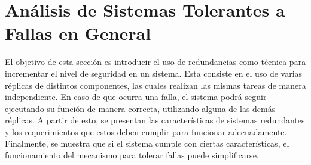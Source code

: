 \section{Análisis de Sistemas Tolerantes a Fallas en General}\label{sec:requerimentos_sistema_tolerancia_fallas}





El objetivo de esta sección es introducir el uso de redundancias como técnica para incrementar el nivel de seguridad en un sistema. Esta consiste en el uso de varias réplicas de distintos componentes, las cuales realizan las mismas tareas de manera independiente. En caso de que ocurra una falla, el sistema podrá seguir ejecutando su función de manera correcta, utilizando alguna de las demás réplicas. A partir de esto, se presentan las características de sistemas redundantes y los requerimientos que estos deben cumplir para funcionar adecuadamente. Finalmente, se muestra que si el sistema cumple con ciertas características, %
el funcionamiento del mecanismo para tolerar fallas puede simplificarse.


